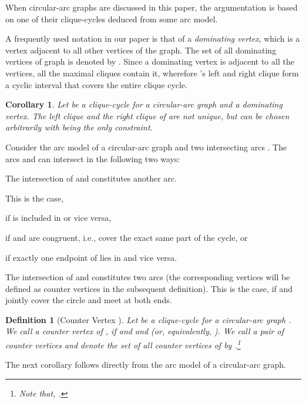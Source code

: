 \documentclass[10pt]{article}
\newtheorem{corollary}[theorem]{Corollary}
\newtheorem{definition}[theorem]{Definition}
\begin{document}
When circular-arc graphs are discussed in this paper, the argumentation is based 
on one of their clique-cycles deduced from some arc model.

A frequently used notation in our paper is that of a {\em dominating vertex}, which
is a vertex adjacent to all other vertices of the graph.  The set of all
dominating vertices of graph  is denoted by .
Since a dominating vertex  is adjacent to all the vertices, 
all the maximal cliques contain it, wherefore 's left and right clique form a cyclic interval that covers the entire clique cycle.


\begin{corollary}\label{remarkDoms}
Let  be a clique-cycle for a circular-arc graph  
and  a dominating vertex.
The left clique  and the right clique  of  are not unique, 
but can be chosen arbitrarily with 
 being the only constraint.
\end{corollary}




Consider the arc model of a circular-arc graph and two intersecting arcs .
The arcs  and  can intersect in the following two ways:
\begin{inparaenum}
\item
The intersection of  and  constitutes another arc.
\begin{inparaenum}
This is the case,
\item
if  is included in  or vice versa,
\item
if  and  are congruent, 
i.e., cover the exact same part of the cycle, or 
\item
if exactly one endpoint of  lies in  and vice versa.
\end{inparaenum}
\item
The intersection of  and  constitutes two arcs (the corresponding vertices will 
be defined as counter vertices in the subsequent definition).
This is the case, if  and  jointly cover the circle and meet at both ends.
\end{inparaenum}


\begin{definition}[Counter Vertex ]\label{reaches}
Let  be a clique-cycle for a circular-arc graph .
We call  a \emph{counter vertex} of , if  and  and  (or, equivalently, ).
We call  a \emph{pair of counter vertices} and denote the set of all counter 
vertices of  by .\footnote{Note that, .}
\end{definition}

The next corollary follows directly from the arc model of a circular-arc graph.
\end{document}
